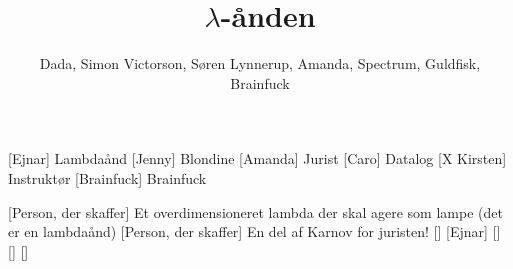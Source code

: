 \documentclass[a4paper,11pt]{article}
\title{$\lambda$-ånden}
\author{Dada, Simon Victorson, Søren Lynnerup, Amanda, Spectrum, Guldfisk, Brainfuck}
\begin{document}
  \maketitle

  \begin{roles}
    [Ejnar] Lambdaånd
    [Jenny] Blondine
    [Amanda] Jurist
    [Caro] Datalog
    [X Kirsten] Instruktør
    [Brainfuck] Brainfuck
  \end{roles}

  \begin{props}
    [Person, der skaffer] Et overdimensioneret lambda der skal agere
    som lampe (det er en lambdaånd)
    [Person, der skaffer] En del af Karnov for juristen!
    []
    [Ejnar]
    []
    []
    []
  \end{props}
\end{document}
